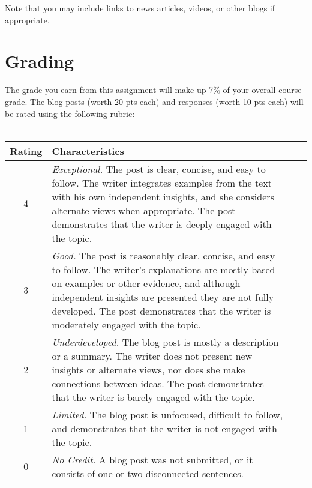 \documentclass[12pt,letterpaper]{article}
\begin{document}
Note that you may include links to news articles, videos, or other blogs if appropriate.




\section *{Grading}
The grade you earn from this assignment will make up 7\% of your overall course grade.  The blog posts (worth 20 pts each) and responses (worth 10 pts each) will be rated using the following rubric:\\\\

\begin{minipage}{\linewidth}
\centering

\begin{tabular}{|c|p{14cm}|l|c|}\toprule[1.25pt]
\bf Rating	& \bf Characteristics\\\midrule
4	& \emph{Exceptional.} The post is clear, concise, and easy to follow. The writer integrates examples from the text with his own independent insights, and she considers alternate views when appropriate. The post demonstrates that the writer is deeply engaged with the topic.\\ \hline

3	& \emph{Good.} The post is reasonably clear, concise, and easy to follow. The writer's explanations are mostly based on examples or other evidence, and although independent insights are presented they are not fully developed. The post demonstrates that the writer is moderately engaged with the topic.\\ \hline

2	& \emph{Underdeveloped.} The blog post is mostly a description or a summary. The writer does not present new insights or alternate views, nor does she make connections between ideas. The post demonstrates that the writer is barely engaged with the topic.\\ \hline

1	& \emph{Limited.} The blog post is unfocused, difficult to follow, and demonstrates that the writer is not engaged with the topic.\\ \hline

0	& \emph{No Credit.} A blog post was not submitted, or it consists of one or two disconnected sentences.\\ \hline

\bottomrule[1.25pt]

\end {tabular}\par
\end{minipage}\\
\end{document}
